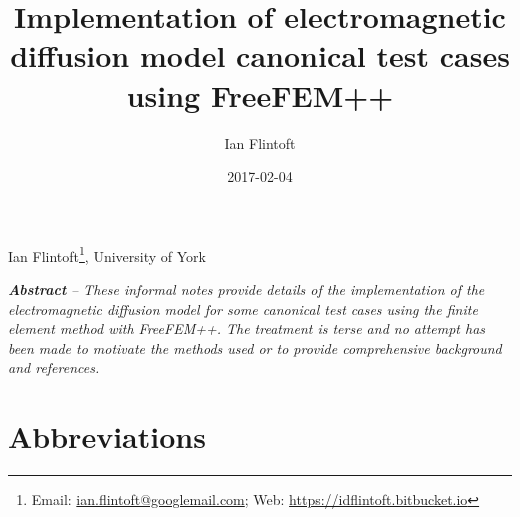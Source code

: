 \documentclass[a4paper]{article}
\title{Implementation of electromagnetic diffusion model canonical test cases using FreeFEM++}
\author{Ian Flintoft}
\date{2017-02-04}
\newcommand{\mydate}{\formatdate{3}{6}{2017}}
\numberwithin{equation}{section}
\begin{document}
\clearpage{}
\vspace{5mm}
\thispagestyle{plain}
{\centering\large 
Ian Flintoft\footnote{ Email: \href{mailto:ian.flintoft@googlemail.com}{ian.flintoft@googlemail.com}; 
Web: \url{https://idflintoft.bitbucket.io}}, University of York
\par}
\vspace{5mm}
{\centering
\mydate
\par}
\vspace{5mm}
\textbf{\textit{Abstract}}\textit{ -- These informal notes provide details of the implementation of the 
electromagnetic diffusion model for some canonical test cases using the finite element method
with FreeFEM++. The treatment is terse and no attempt has been made to motivate the methods used or to provide
comprehensive background and references. 
}
%
\setcounter{tocdepth}{3}
\renewcommand\contentsname{Contents}
\tableofcontents
%
\newpage

\section*{Abbreviations}
\label{sc:abbrev}
\end{document}
